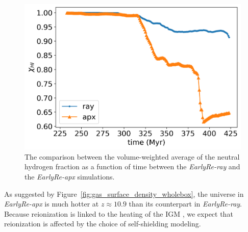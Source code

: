 \documentclass[linenumbers, twocolumn]{aastex631}
\begin{document}
\begin{figure}
    \centering
    \includegraphics[width=0.95\columnwidth]{EarlyRe/neutralHfraction_evolution.png}
    \caption{The comparison between the volume-weighted average of the neutral hydrogen fraction as a function of time between the \textit{EarlyRe-ray} and the \textit{EarlyRe-apx} simulations.}
    \label{fig:neutralHfrac_evolution}
\end{figure}

As suggested by Figure~\ref{fig:gas_surface_density_wholebox}, the universe in \textit{EarlyRe-apx} is much hotter at $z \approx 10.9$ than its counterpart in \textit{EarlyRe-ray}. Because reionization is linked to the heating of the IGM \citep{DAloisio+2019}, we expect that reionization is affected by the choice of self-shielding modeling.  



\end{document}
